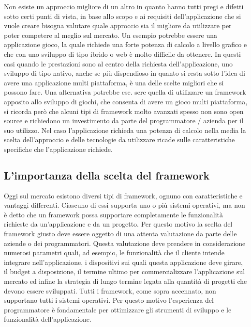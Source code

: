 Non esiste un approccio migliore di un altro in quanto hanno tutti pregi e difetti sotto certi punti di vista, in base allo scopo e ai requisiti dell'applicazione che si vuole creare bisogna valutare quale approccio sia il migliore da utilizzare per poter competere al meglio sul mercato.
Un esempio potrebbe essere una applicazione gioco, la quale richiede una forte potenza di calcolo a livello grafico e che con uno sviluppo di tipo ibrido o web è molto difficile da ottenere. In questi casi quando le prestazioni sono al centro della richiesta dell'applicazione, uno sviluppo di tipo nativo, anche se più dispendioso in quanto si resta sotto l'idea di avere una applicazione multi piattaforma, è una delle scelte migliori che si possono fare.
Una alternativa potrebbe ese.
sere quella di utilizzare un framework apposito allo sviluppo di giochi, che consenta di avere un gioco multi piattaforma, si ricorda però che alcuni tipi di framework molto avanzati spesso non sono open source e richiedono un investimento da parte del programmatore / azienda per il suo utilizzo.
Nel caso l'applicazione richieda una potenza di calcolo nella media la scelta dell'approccio e delle tecnologie da utilizzare ricade sulle caratteristiche specifiche che l'applicazione richiede.


\subsection{L'importanza della scelta del framework}

Oggi sul mercato esistono diversi tipi di framework, ognuno con caratteristiche e vantaggi differenti. Ciascuno di essi supporta uno o più sistemi operativi, ma non è detto che un framework possa supportare completamente le funzionalità richieste da un'applicazione e da un progetto.
Per questo motivo la scelta del framework giusto deve essere oggetto di una attenta valutazione da parte delle aziende o dei programmatori. Questa valutazione deve prendere in considerazione numerosi parametri quali, ad esempio, le funzionalità che il cliente intende integrare nell'applicazione, i dispositivi sui quali questa applicazione deve girare, il budget a disposizione, il termine ultimo per commercializzare l'applicazione sul mercato ed infine la strategia di lungo termine legata alla quantità di progetti che devono essere sviluppati.
Tutti i framework, come sopra accennato, non supportano tutti i sistemi operativi. Per questo motivo l'esperienza del programmatore è fondamentale per ottimizzare gli strumenti di sviluppo e le funzionalità dell'applicazione.

